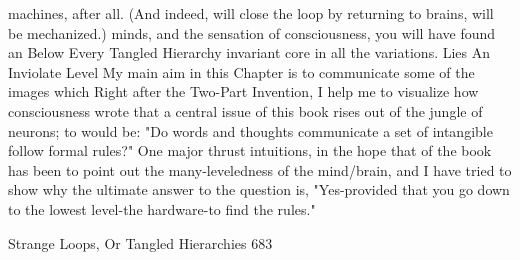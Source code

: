 machines, after all. (And indeed, will      close the loop by returning to brains,
will be mechanized.)                        minds,      and     the     sensation   of
                                            consciousness, you will have found an
Below Every Tangled Hierarchy               invariant core in all the variations.
    Lies An Inviolate Level                         My main aim in this Chapter is to
                                            communicate some of the images which
Right after the Two-Part Invention, I       help me to visualize how consciousness
wrote that a central issue of this book     rises out of the jungle of neurons; to
would be: "Do words and thoughts            communicate a set of intangible
follow formal rules?" One major thrust      intuitions, in the hope that
of the book has been to point out the
many-leveledness of the mind/brain, and
I have tried to show why the ultimate
answer to the question is, "Yes-provided
that you go down to the lowest level-the
hardware-to find the rules."


Strange Loops, Or Tangled Hierarchies                                             683

